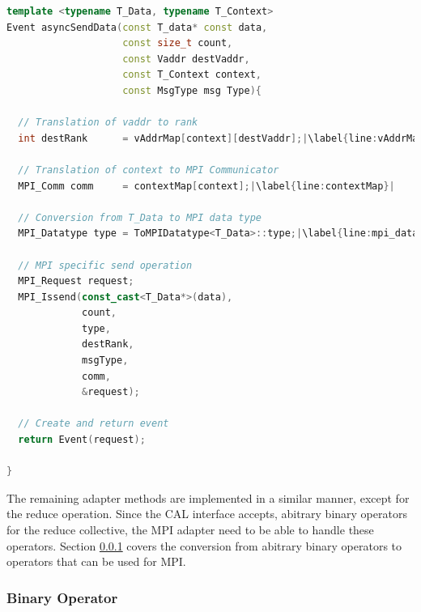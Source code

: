 \begin{lstlisting}[language=C++, breaklines=false, label={lst:adapter_send},escapechar=|]
template <typename T_Data, typename T_Context>      
Event asyncSendData(const T_data* const data, 
                    const size_t count, 
                    const Vaddr destVaddr, 
                    const T_Context context, 
                    const MsgType msg Type){    

  // Translation of vaddr to rank
  int destRank      = vAddrMap[context][destVaddr];|\label{line:vAddrMap}|

  // Translation of context to MPI Communicator
  MPI_Comm comm     = contextMap[context];|\label{line:contextMap}|

  // Conversion from T_Data to MPI data type
  MPI_Datatype type = ToMPIDatatype<T_Data>::type;|\label{line:mpi_datatype}|

  // MPI specific send operation                                                                            
  MPI_Request request; 
  MPI_Issend(const_cast<T_Data*>(data), 
             count, 
             type,
             destRank, 
             msgType,
             comm,
             &request);

  // Create and return event
  return Event(request);                                                                                                       

}  
\end{lstlisting}

The remaining adapter methods are implemented in a similar manner,
except for the reduce operation. Since the CAL interface accepts,
abitrary binary operators for the reduce collective, the MPI
adapter need to be able to handle these operators. Section
\ref{sec:bin_operator} covers the conversion from abitrary
binary operators to operators that can be used for MPI.


\subsubsection{Binary Operator}
\label{sec:bin_operator}

